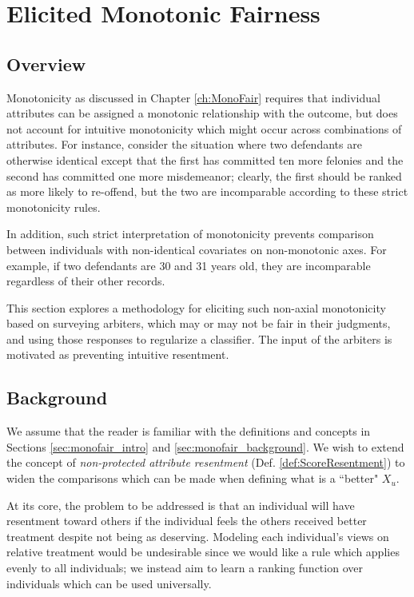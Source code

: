 \chapter{Elicited Monotonic Fairness} \label{ch:SoftMonoFair}

\section{Overview}

    Monotonicity as discussed in Chapter \ref{ch:MonoFair} requires that individual attributes can be assigned a monotonic relationship with the outcome, but does not account for intuitive monotonicity which might occur across combinations of attributes.  For instance, consider the situation where two defendants are otherwise identical except that the first has committed ten more felonies and the second has committed one more misdemeanor; clearly, the first should be ranked as more likely to re-offend, but the two are incomparable according to these strict monotonicity rules.  
    
    In addition, such strict interpretation of monotonicity prevents comparison between individuals with non-identical covariates on non-monotonic axes.  For example, if two defendants are 30 and 31 years old, they are incomparable regardless of their other records.
    
    This section explores a methodology for eliciting such non-axial monotonicity based on surveying arbiters, which may or may not be fair in their judgments, and using those responses to regularize a classifier.  The input of the arbiters is motivated as preventing intuitive resentment. 

\section{Background}\label{sec:softmono_bg}
    
    We assume that the reader is familiar with the definitions and concepts in Sections \ref{sec:monofair_intro} and \ref{sec:monofair_background}.  We wish to extend the concept of \emph{non-protected attribute resentment} (Def. \ref{def:ScoreResentment}) to widen the comparisons which can be made when defining what is a ``better" $X_u$.
    
    At its core, the problem to be addressed is that an individual will have resentment toward others if the individual feels the others received better treatment despite not being as deserving.  Modeling each individual's views on relative treatment would be undesirable since we would like a rule which applies evenly to all individuals; we instead aim to learn a ranking function over individuals which can be used universally.  
    
